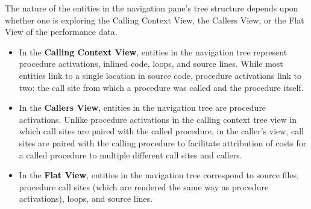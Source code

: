  The nature of the entities in the navigation pane's tree structure depends upon whether one is exploring the Calling Context View, the Callers View, or the Flat View of the performance data.
\begin{itemize}
\item In the \textbf{Calling Context View}, entities in the navigation tree represent procedure activations, inlined code, loops, and source lines. While most entities link to a single location in source code, procedure activations link to two: the call site from which a procedure was called and the procedure itself.

\item In the \textbf{Callers View}, entities in the navigation tree are procedure activations. Unlike procedure activations in the calling context tree view in which call sites are paired with the called procedure, in the caller's view, call sites are paired with the calling procedure to facilitate attribution of costs for a called procedure to multiple different call sites and callers.

\item In the \textbf{Flat View}, entities in the navigation tree correspond to source files, procedure call sites (which are rendered the same way as procedure activations), loops, and source lines.
\end{itemize}



